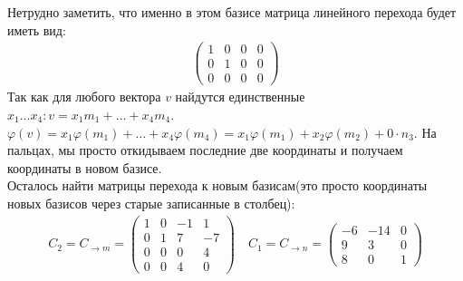 \documentclass[a4paper,11pt]{article}
\begin{document}
Нетрудно заметить, что именно в этом базисе матрица линейного перехода будет иметь вид:
\begin{gather*}
\begin{pmatrix}
1 & 0 & 0 & 0 \\[2pt]
0 & 1 & 0 & 0 \\[2pt]
0 & 0 & 0 & 0
\end{pmatrix}
\end{gather*}
Так как для любого вектора $ v $ найдутся единственные $ x_1 ... x_4 : v = x_1m_1 + \dots + x_4m_4 $. $ \varphi(v) = x_1\varphi(m_1) + \dots + x_4\varphi(m_4) = x_1\varphi(m_1) + x_2\varphi(m_2) + 0\cdot n_3$. На пальцах, мы просто откидываем последние две координаты и получаем координаты в новом базисе. \\[2pt]
Осталось найти матрицы перехода к новым базисам(это просто координаты новых базисов через старые записанные в столбец):
\begin{gather*}
C_2 = C_{\to m} = 
\begin{pmatrix}
1 & 0 & -1 & 1 \\[2pt]
0 & 1 & 7 & -7 \\[2pt]
0 & 0 & 0 & 4 \\[2pt]
0 & 0 & 4 & 0
\end{pmatrix}
\quad
C_1 = C_{\to n} = 
\begin{pmatrix}
-6 & -14 & 0 \\[2pt]
9 & 3 & 0  \\[2pt]
8 & 0 & 1
\end{pmatrix}
\end{gather*}
\newpage



\end{document}
